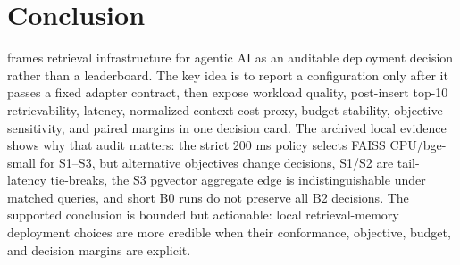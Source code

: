 \section{Conclusion}

\sys frames retrieval infrastructure for agentic AI as an auditable deployment decision rather than a leaderboard. The key idea is to report a configuration only after it passes a fixed adapter contract, then expose workload quality, post-insert top-10 retrievability, \maxrowp latency, normalized context-cost proxy, budget stability, objective sensitivity, and paired margins in one decision card. The archived local evidence shows why that audit matters: the strict 200 ms policy selects FAISS CPU/bge-small for S1--S3, but alternative objectives change decisions, S1/S2 are tail-latency tie-breaks, the S3 pgvector aggregate edge is indistinguishable under matched queries, and short B0 runs do not preserve all B2 decisions. The supported conclusion is bounded but actionable: local retrieval-memory deployment choices are more credible when their conformance, objective, budget, and decision margins are explicit.
